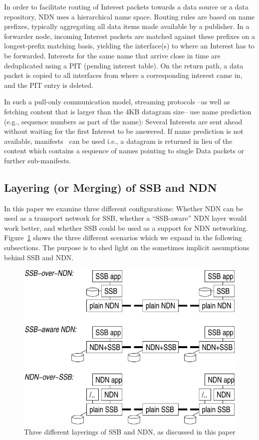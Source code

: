\documentclass[10pt,sigconf,rewiew]{acmart}
\begin{document}
In order to facilitate routing of Interest packets towards a data
source or a data repository, NDN uses a hierarchical name
space. Routing rules are based on name prefixes, typically aggregating
all data items made available by a publisher. In a forwarder node,
incoming Interest packets are matched against these prefixes on a
longest-prefix matching basis, yielding the interface(s) to where an
Interest has to be forwarded. Interests for the same name that arrive
close in time are deduplicated using a PIT (pending interest
table). On the return path, a data packet is copied to all interfaces
from where a corresponding interest came in, and the PIT entry is
deleted.

In such a pull-only communication model, streaming protocols --as well
as fetching content that is larger than the 4KB datagram size-- use
name prediction (e.g., sequence numbers as part of the name): Several
Interests are sent ahead without waiting for the first Interest to be
answered. If name prediction is not available,
manifests~\cite{DBLP:conf/infocom/BaugherDNO12} can be used i.e., a datagram is returned in
lieu of the content which contains a sequence of names pointing to
single Data packets or further sub-manifests.

\subsection{Layering (or Merging) of SSB and NDN}

In this paper we examine three different configurations: Whether NDN
can be used as a transport network for SSB, whether a ``SSB-aware''
NDN layer would work better, and whether SSB could be used as a
support for NDN networking. Figure~\ref{fig:ssb-and-ndn} shows the
three different scenarios which we expand in the following
subsections. The purpose is to shed light on the sometimes implicit
assumptions behind SSB and NDN.

\begin{figure}[htb]
  \raggedright
  \includegraphics[width=0.9\columnwidth]{figs/ssb-and-ndn.pdf}
  \caption{\label{fig:ssb-and-ndn}Three different layerings of SSB and NDN,
    as discussed in this paper}
\end{figure}
\end{document}
